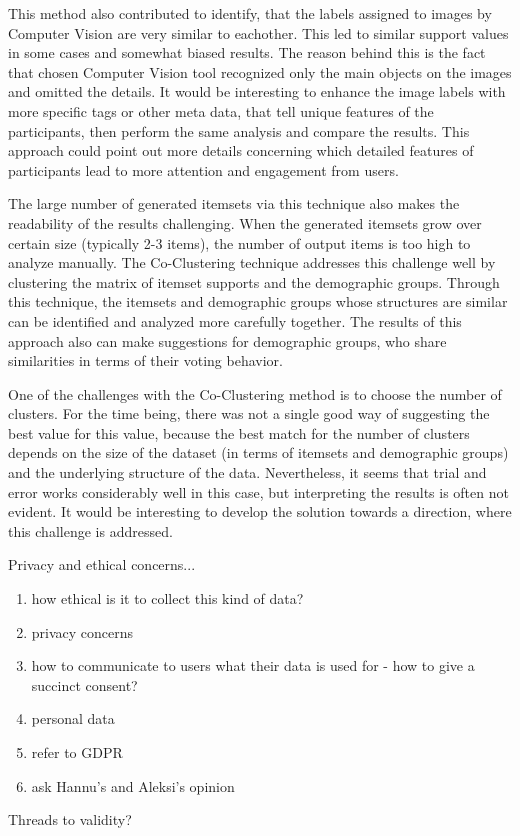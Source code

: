This method also contributed to identify, that the labels assigned to images by Computer Vision are very similar to eachother. This led to similar support values in some cases and somewhat biased results. The reason behind this is the fact that chosen Computer Vision tool recognized only the main objects on the images and omitted the details. It would be interesting to enhance the image labels with more specific tags or other meta data, that tell unique features of the participants, then perform the same analysis and compare the results. This approach could point out more details concerning which detailed features of participants lead to more attention and engagement from users.

The large number of generated itemsets via this technique also makes the readability of the results challenging. When the generated itemsets grow over certain size (typically 2-3 items), the number of output items is too high to analyze manually. The Co-Clustering technique addresses this challenge well by clustering the matrix of itemset supports and the demographic groups. Through this technique, the itemsets and demographic groups whose structures are similar can be identified and analyzed more carefully together. The results of this approach also can make suggestions for demographic groups, who share similarities in terms of their voting behavior.

One of the challenges with the Co-Clustering method is to choose the number of clusters. For the time being, there was not a single good way of suggesting the best value for this value, because the best match for the number of clusters depends on the size of the dataset (in terms of itemsets and demographic groups) and the underlying structure of the data. Nevertheless, it seems that trial and error works considerably well in this case, but interpreting the results is often not evident. It would be interesting to develop the solution towards a direction, where this challenge is addressed.

Privacy and ethical concerns...

\begin{enumerate}
    \item how ethical is it to collect this kind of data?
    \item privacy concerns
    \item how to communicate to users what their data is used for - how to give a succinct consent?
    \item personal data
    \item refer to GDPR 
    \item ask Hannu's and Aleksi's opinion
\end{enumerate}

Threads to validity? 
